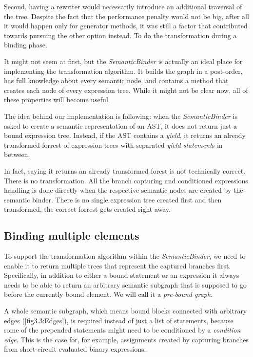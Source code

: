 Second, having a rewriter would necessarily introduce an additional traversal of the tree. Despite the fact that the performance penalty would not be big, after all it would happen only for generator methods, it was still a factor that contributed towards pursuing the other option instead. To do the transformation during a binding phase. 

It might not seem at first, but the \emph{SemanticBinder} is actually an ideal place for implementing the transformation algorithm. It builds the graph in a post-order, has full knowledge about every semantic node, and contains a method that creates each node of every expression tree. While it might not be clear now, all of these properties will become useful.

The idea behind our implementation is following: when the \emph{SemanticBinder} is asked to create a semantic representation of an AST, it does not return just a bound expression tree. Instead, if the AST contains a \emph{yield}, it returns an already transformed forrest of expression trees with separated \emph{yield statement}s in between. 

In fact, saying it returns an already transformed forest is not technically correct. There is no transformation. All the branch capturing and conditioned expressions handling is done directly when the respective semantic nodes are created by the semantic binder. There is no single expression tree created first and then transformed, the correct forrest gets created right away.

\subsection{Binding multiple elements}

To support the transformation algorithm within the \emph{SemanticBinder}, we need to enable it to return multiple trees that represent the captured branches first. Specifically, in addition to either a bound statement or an expression it always needs to be able to return an arbitrary semantic subgraph that is supposed to go before the currently bound element. We will call it a \emph{pre-bound graph}.

A whole semantic subgraph, which means bound blocks connected with arbitrary edges (\autoref{fig3.3:Edges}), is required instead of just a list of statements, because some of the prepended statements might need to be conditioned by a \emph{condition edge}. This is the case for, for example, assignments created by capturing branches from short-circuit evaluated binary expressions. 

